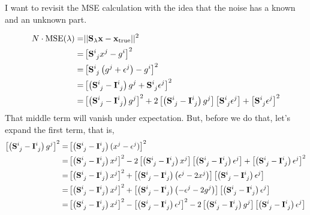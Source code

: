 \documentclass[11pt]{article}
\begin{document}
I want to revisit the MSE calculation with the idea that the noise has a known and an unknown part.

\begin{align}
    N \cdot \textrm{MSE}(\lambda) =& || \mathbf{S_\lambda}\mathbf{x} - \mathbf{x}_{\textrm{true}} ||^2 \\
    =&  \left[ \mathbf{S}\indices{^i_j} x^j - g^i \right]^2 \\
    =&  \left[ \mathbf{S}\indices{^i_j} \left( g^j + \epsilon^j \right) - g^i \right]^2 \\
    =&  \left[ \left(\mathbf{S}\indices{^i_j} -\mathbf{I}\indices{^i_j} \right) g^j + \mathbf{S}\indices{^i_j} \epsilon^j \right]^2 \\
    =& \left[ \left(\mathbf{S}\indices{^i_j} -\mathbf{I}\indices{^i_j} \right) g^j \right]^2 + 2 \left[ \left(\mathbf{S}\indices{^i_j} -\mathbf{I}\indices{^i_j} \right) g^j \right]  \left[ \mathbf{S}\indices{^i_j} \epsilon^j \right]+ \left[ \mathbf{S}\indices{^i_j} \epsilon^j \right]^2
\end{align}
That middle term will vanish under expectation. But, before we do that, let's expand the first term, that is,
\begin{align}
\left[ \left(\mathbf{S}\indices{^i_j} -\mathbf{I}\indices{^i_j} \right) g^j \right]^2  =& \left[ \left(\mathbf{S}\indices{^i_j} -\mathbf{I}\indices{^i_j} \right) (x^j-\epsilon^j) \right]^2 \\
=&  \left[ \left(\mathbf{S}\indices{^i_j} -\mathbf{I}\indices{^i_j} \right)x^j \right]^2 - 2 \left[ \left(\mathbf{S}\indices{^i_j} -\mathbf{I}\indices{^i_j} \right)x^j \right] \left[ \left(\mathbf{S}\indices{^i_j} -\mathbf{I}\indices{^i_j} \right)\epsilon^j \right] + \left[ \left(\mathbf{S}\indices{^i_j} -\mathbf{I}\indices{^i_j} \right)\epsilon^j \right]^2 \\
=&  \left[ \left(\mathbf{S}\indices{^i_j} -\mathbf{I}\indices{^i_j} \right)x^j \right]^2 + \left[ \left(\mathbf{S}\indices{^i_j} -\mathbf{I}\indices{^i_j} \right) \left( \epsilon^j - 2 x^j \right) \right] \left[ \left(\mathbf{S}\indices{^i_j} -\mathbf{I}\indices{^i_j} \right)\epsilon^j \right] \\
=&  \left[ \left(\mathbf{S}\indices{^i_j} -\mathbf{I}\indices{^i_j} \right)x^j \right]^2 + \left[ \left(\mathbf{S}\indices{^i_j} -\mathbf{I}\indices{^i_j} \right) \left( - \epsilon^j - 2 g^j \right) \right] \left[ \left(\mathbf{S}\indices{^i_j} -\mathbf{I}\indices{^i_j} \right)\epsilon^j \right] \\
=& \left[ \left(\mathbf{S}\indices{^i_j} -\mathbf{I}\indices{^i_j} \right)x^j \right]^2 - \left[ \left(\mathbf{S}\indices{^i_j} -\mathbf{I}\indices{^i_j} \right)\epsilon^j \right]^2 - 2 \left[ \left(\mathbf{S}\indices{^i_j} -\mathbf{I}\indices{^i_j} \right) g^j \right] \left[ \left(\mathbf{S}\indices{^i_j} -\mathbf{I}\indices{^i_j} \right)\epsilon^j \right] 
\end{align}
\end{document}
